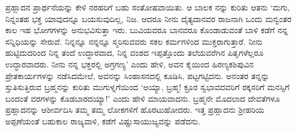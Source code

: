 ಪ್ರಹ್ಲಾದನ ಪ್ರಾರ್ಥನೆಯನ್ನು ಕೇಳಿ ನರಹರಿಗೆ ಬಹು ಸಂತೋಷವಾಯಿತು. ಆ ಬಾಲಕ ನನ್ನು ಕುರಿತು ಆತನು ‘ಮಗು, ನಿನ್ನಂತಹ ಭಕ್ತ ಯಾವುದನ್ನೂ ಬಯಸುವುದಿಲ್ಲ, ನಿಜ. ಆದರೂ ನೀನು ದೈತ್ಯದಾನವರ ರಾಜನಾಗಿ ಒಂದು ಮನ್ವಂತರ ಕಾಲ ಇಹ ಭೋಗಗಳನ್ನು ಅನುಭವಿಸುತ್ತಾ ಇರು. ಬುವಿಯವರೂ ಬಾನವರೂ ಕೊಂಡಾಡುವಂತೆ ಬಾಳಿ ಕಡೆಗೆ ನನ್ನ ಸನ್ನಿಧಿಯನ್ನು ಸೇರುವೆ. ನಿನ್ನನ್ನೂ ನನ್ನನ್ನೂ ಸ್ಮರಿಸುವವರು ಸಕಲ ಕರ್ಮಗಳಿಂದ ಮುಕ್ತರಾಗುತ್ತಾರೆ. ನೀನು ಹುಟ್ಟಿದುದರಿಂದ ನಿನ್ನ ತಂದೆ ಉದ್ಧಾರವಾದ, ನಿನ್ನ ವಂಶದ ಇಪ್ಪತ್ತೊಂದು ತಲೆಯವರೆಗಿನ ಪಿತೃಗಳೆಲ್ಲರೂ ಉದ್ಧಾರವಾದರು. ನೀನು ನನ್ನ ಭಕ್ತರಲ್ಲಿ ಅಗ್ರಗಣ್ಯ’ ಎಂದು ಹೇಳಿ, ಅವನ ಕೈಯಿಂದ ಹಿರಣ್ಯಕಶಿಪುವಿನ ಪ್ರೇತಕಾರ್ಯಗಳನ್ನು ನಡೆಸಿದಮೇಲೆ, ಅವನನ್ನು ಸಿಂಹಾಸನದಲ್ಲಿ ಕೂಡಿಸಿ, ಪಟ್ಟಗಟ್ಟಿದನು. ಅನಂತರ ತನ್ನನ್ನು ಸ್ತುತಿಸುತ್ತಿರುವ ಬ್ರಹ್ಮನನ್ನು ಕುರಿತು ಮುಗುಳ್ನಗೆಯಿಂದ ‘ಅಯ್ಯಾ, ಬ್ರಹ್ಮ! ಕ್ರೂರ ಸ್ವಭಾವದವರಿಗೆ ರಕ್ಕಸರಿಗೆ ಮನಸ್ಸಿಗೆ ಬಂದಂತೆ ವರಗಳನ್ನು ಕೊಡಬಾರದಯ್ಯಾ!’ ಎಂದು ಹೇಳಿ ಮಾಯವಾದನು. ಬ್ರಹ್ಮನೇ ಮೊದಲಾದ ದೇವತೆಗಳೂ ಪ್ರಹ್ಲಾದನನ್ನು ಆಶೀರ್ವದಿಸಿ ತಮ್ಮ ತಮ್ಮ ಲೋಕಗಳಿಗೆ ಹೊರಟುಹೋದರು. ಇತ್ತ ಪ್ರಹ್ಲಾದನು ಶ್ರೀಹರಿಯ ಅಪ್ಪಣೆಯಂತೆ ಬಹುಕಾಲ ರಾಜ್ಯವಾಳಿ, ಕಡೆಗೆ ವಿಷ್ಣುಸಾಯುಜ್ಯವನ್ನು ಪಡೆದನು.

